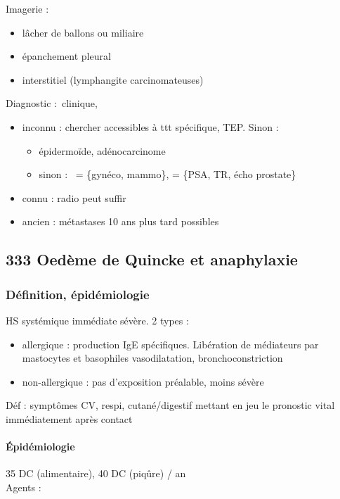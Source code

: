 \documentclass[11pt]{article}
\begin{document}
Imagerie : 

\begin{itemize}
\item lâcher de ballons ou miliaire
\item épanchement pleural
\item interstitiel (lymphangite carcinomateuses)
\end{itemize}


Diagnostic : clinique, 

\begin{itemize}
\item inconnu : chercher accessibles à ttt spécifique, TEP. Sinon :

\begin{itemize}
\item épidermoïde, adénocarcinome
\item sinon : \female{} = \{gynéco, mammo\}, \male{} = \{PSA, TR, écho prostate\}
\end{itemize}

\item connu : radio peut suffir
\item ancien : métastases 10 ans plus tard possibles
\end{itemize}

\subsection{333 \textdagger{} Oedème de Quincke et anaphylaxie}
\label{sec:orgadea966}
\label{sec:333_oedeme_de_quincke_et_anaphylaxie}

\subsubsection{Définition, épidémiologie}
\label{sec:org05162b4}
HS systémique immédiate sévère. 2 types :

\begin{itemize}
\item allergique : production IgE spécifiques. Libération de médiateurs par
mastocytes et basophiles \thus vasodilatation, bronchoconstriction
\item non-allergique : pas d'exposition préalable, moins sévère
\end{itemize}

Déf : symptômes CV, respi, cutané/digestif mettant en
jeu le pronostic vital immédiatement après contact

\paragraph{Épidémiologie}
\label{sec:org2fdceca}
35 DC (alimentaire), 40 DC (piqûre) / an\\
Agents :
\end{document}
